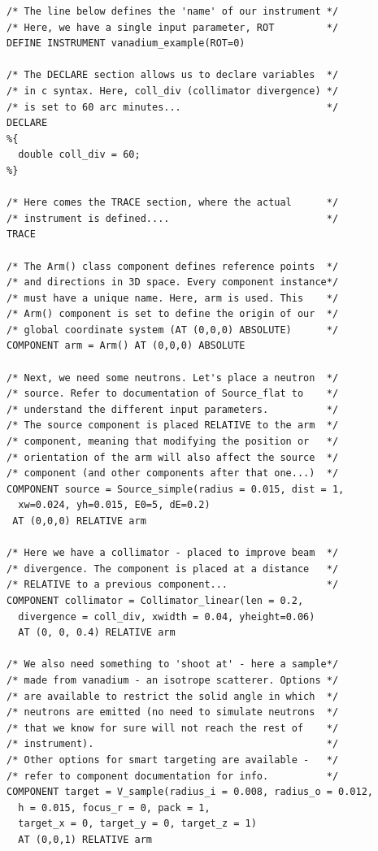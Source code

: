 \begin{verbatim}
/* The line below defines the 'name' of our instrument */
/* Here, we have a single input parameter, ROT         */
DEFINE INSTRUMENT vanadium_example(ROT=0)

/* The DECLARE section allows us to declare variables  */
/* in c syntax. Here, coll_div (collimator divergence) */
/* is set to 60 arc minutes...                         */
DECLARE
%{
  double coll_div = 60;
%}

/* Here comes the TRACE section, where the actual      */
/* instrument is defined....                           */
TRACE

/* The Arm() class component defines reference points  */
/* and directions in 3D space. Every component instance*/
/* must have a unique name. Here, arm is used. This    */
/* Arm() component is set to define the origin of our  */
/* global coordinate system (AT (0,0,0) ABSOLUTE)      */
COMPONENT arm = Arm() AT (0,0,0) ABSOLUTE

/* Next, we need some neutrons. Let's place a neutron  */
/* source. Refer to documentation of Source_flat to    */
/* understand the different input parameters.          */
/* The source component is placed RELATIVE to the arm  */
/* component, meaning that modifying the position or   */
/* orientation of the arm will also affect the source  */
/* component (and other components after that one...)  */
COMPONENT source = Source_simple(radius = 0.015, dist = 1,
  xw=0.024, yh=0.015, E0=5, dE=0.2)
 AT (0,0,0) RELATIVE arm

/* Here we have a collimator - placed to improve beam  */
/* divergence. The component is placed at a distance   */
/* RELATIVE to a previous component...                 */
COMPONENT collimator = Collimator_linear(len = 0.2, 
  divergence = coll_div, xwidth = 0.04, yheight=0.06)
  AT (0, 0, 0.4) RELATIVE arm

/* We also need something to 'shoot at' - here a sample*/
/* made from vanadium - an isotrope scatterer. Options */
/* are available to restrict the solid angle in which  */
/* neutrons are emitted (no need to simulate neutrons  */
/* that we know for sure will not reach the rest of    */
/* instrument).                                        */
/* Other options for smart targeting are available -   */
/* refer to component documentation for info.          */
COMPONENT target = V_sample(radius_i = 0.008, radius_o = 0.012, 
  h = 0.015, focus_r = 0, pack = 1,
  target_x = 0, target_y = 0, target_z = 1)
  AT (0,0,1) RELATIVE arm


\end{verbatim}
